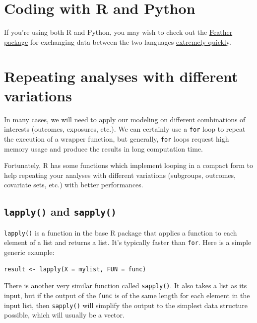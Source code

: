 \documentclass[
]{book}
\begin{document}
\section{Coding with R and Python}\label{coding-with-r-and-python}

If you're using both R and Python, you may wish to check out the \href{https://www.rdocumentation.org/packages/feather/versions/0.3.3}{Feather package} for exchanging data between the two languages \href{https://blog.rstudio.com/2016/03/29/feather/}{extremely quickly}.

\section{Repeating analyses with different variations}\label{repeating-analyses-with-different-variations}

In many cases, we will need to apply our modeling on different combinations of interests (outcomes, exposures, etc.). We can certainly use a \texttt{for} loop to repeat the execution of a wrapper function, but generally, \texttt{for} loops request high memory usage and produce the results in long computation time.

Fortunately, R has some functions which implement looping in a compact form to help repeating your analyses with different variations (subgroups, outcomes, covariate sets, etc.) with better performances.

\subsection{\texorpdfstring{\texttt{lapply()} and \texttt{sapply()}}{lapply() and sapply()}}\label{lapply-and-sapply}

\texttt{lapply()} is a function in the base R package that applies a function to each element of a list and returns a list. It's typically faster than \texttt{for}. Here is a simple generic example:

\begin{verbatim}
result <- lapply(X = mylist, FUN = func)
\end{verbatim}

There is another very similar function called \texttt{sapply()}. It also takes a list as its input, but if the output of the \texttt{func} is of the same length for each element in the input list, then \texttt{sapply()} will simplify the output to the simplest data structure possible, which will usually be a vector.
\end{document}
